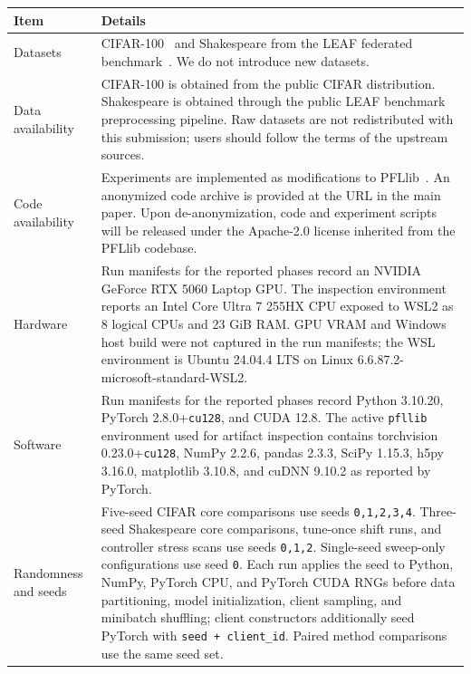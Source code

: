 \documentclass[letterpaper]{article}
\begin{document}
\begin{table}[t]
\centering
\small
\setlength{\tabcolsep}{4pt}
\renewcommand{\arraystretch}{1.08}
\begin{tabular*}{\textwidth}{@{\extracolsep{\fill}}p{}p{}@{}}
\toprule
\textbf{Item} & \textbf{Details} \\
\midrule
Datasets &
CIFAR-100~\cite{krizhevsky2009learning} and Shakespeare from the LEAF federated benchmark~\cite{caldas2018leaf}. We do not introduce new datasets. \\
Data availability &
CIFAR-100 is obtained from the public CIFAR distribution. Shakespeare is obtained through the public LEAF benchmark preprocessing pipeline. Raw datasets are not redistributed with this submission; users should follow the terms of the upstream sources. \\
Code availability &
Experiments are implemented as modifications to PFLlib~\cite{zhang2025pfllib}. An anonymized code archive is provided at the URL in the main paper. Upon de-anonymization, code and experiment scripts will be released under the Apache-2.0 license inherited from the PFLlib codebase. \\
Hardware &
Run manifests for the reported phases record an NVIDIA GeForce RTX 5060 Laptop GPU. The inspection environment reports an Intel Core Ultra 7 255HX CPU exposed to WSL2 as 8 logical CPUs and 23 GiB RAM. GPU VRAM and Windows host build were not captured in the run manifests; the WSL environment is Ubuntu 24.04.4 LTS on Linux 6.6.87.2-microsoft-standard-WSL2. \\
Software &
Run manifests for the reported phases record Python 3.10.20, PyTorch 2.8.0+\texttt{cu128}, and CUDA 12.8. The active \texttt{pfllib} environment used for artifact inspection contains torchvision 0.23.0+\texttt{cu128}, NumPy 2.2.6, pandas 2.3.3, SciPy 1.15.3, h5py 3.16.0, matplotlib 3.10.8, and cuDNN 9.10.2 as reported by PyTorch. \\
Randomness and seeds &
Five-seed CIFAR core comparisons use seeds \texttt{0,1,2,3,4}. Three-seed Shakespeare core comparisons, tune-once shift runs, and controller stress scans use seeds \texttt{0,1,2}. Single-seed sweep-only configurations use seed \texttt{0}. Each run applies the seed to Python, NumPy, PyTorch CPU, and PyTorch CUDA RNGs before data partitioning, model initialization, client sampling, and minibatch shuffling; client constructors additionally seed PyTorch with \texttt{seed + client\_id}. Paired method comparisons use the same seed set. \\

\end{tabular*}
\end{table}
\end{document}
